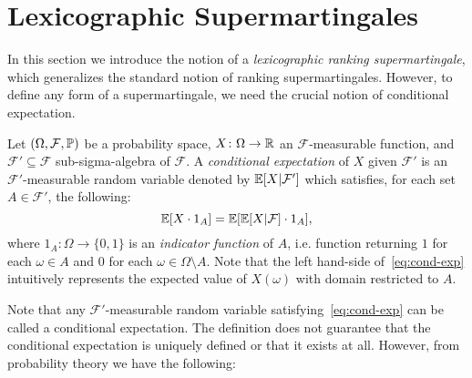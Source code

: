\section{Lexicographic Supermartingales}
\label{sec:lexicographic}

In this section we introduce the notion of a \emph{lexicographic ranking 
supermartingale}, which generalizes the standard notion of ranking 
supermartingales. However, to define any form of a supermartingale, 
we need the crucial notion of conditional expectation.

\smallskip{} 
Let $(\Omega,\mathcal{F},\mathbb{P})$ be a probability space, 
$X\colon\Omega\rightarrow 
\mathbb{R}$ an $\mathcal{F}$-measurable function, and $\mathcal{F}'\subseteq 
\mathcal{F}$ sub-sigma-algebra of $\mathcal{F}$. A \emph{conditional 
	expectation} of $X$ given $\mathcal{F}'$ is an $\mathcal{F}'$-measurable random 
variable denoted by $\mathbb{E}[X| \mathcal{F}']$ which satisfies, for each set $A\in 
\mathcal{F}'$, the following: 
\begin{equation}
\label{eq:cond-exp}
\mathbb{E}[X\cdot 1_A] = \mathbb{E}[\mathbb{E}[X|\mathcal{F}]\cdot 1_A],
\end{equation}
where $1_A \colon \Omega\rightarrow \{0,1\}$ is an \emph{indicator function} of 
$A$, i.e. function returning $1$ for 
each $\omega\in A$ and $0$ for each $\omega\in \Omega\setminus A$. Note that 
the left hand-side of~\eqref{eq:cond-exp} intuitively represents the expected 
value 
of $X(\omega)$ with domain restricted to $A$.

Note that any $\mathcal{F}'$-measurable random variable satisfying~\eqref{eq:cond-exp} can be called a conditional expectation. The definition does not guarantee that the conditional expectation is uniquely defined or that it exists at all. However, from probability theory we have the following:

